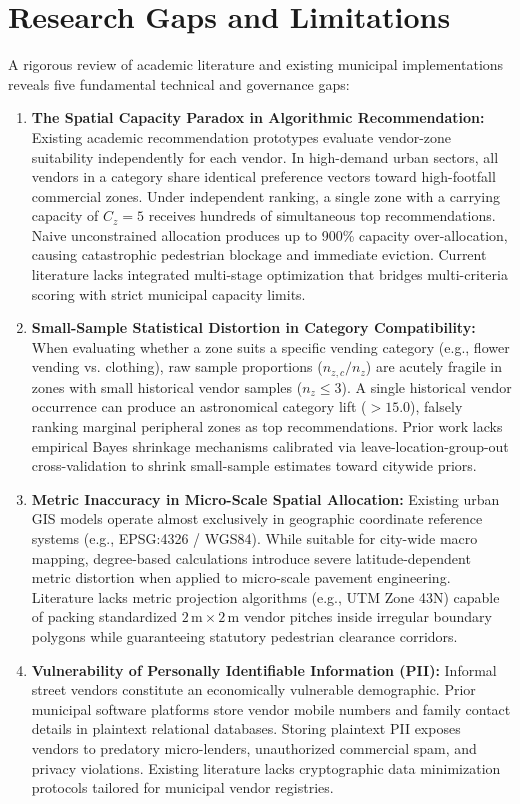 \section{Research Gaps and Limitations}
\label{sec:research_gaps}

A rigorous review of academic literature and existing municipal implementations reveals five fundamental technical and governance gaps:

\begin{enumerate}
    \item \textbf{The Spatial Capacity Paradox in Algorithmic Recommendation:} Existing academic recommendation prototypes evaluate vendor-zone suitability independently for each vendor. In high-demand urban sectors, all vendors in a category share identical preference vectors toward high-footfall commercial zones. Under independent ranking, a single zone with a carrying capacity of $C_z = 5$ receives hundreds of simultaneous top recommendations. Naive unconstrained allocation produces up to 900\% capacity over-allocation, causing catastrophic pedestrian blockage and immediate eviction. Current literature lacks integrated multi-stage optimization that bridges multi-criteria scoring with strict municipal capacity limits.
    \item \textbf{Small-Sample Statistical Distortion in Category Compatibility:} When evaluating whether a zone suits a specific vending category (e.g., flower vending vs. clothing), raw sample proportions ($n_{z,c} / n_z$) are acutely fragile in zones with small historical vendor samples ($n_z \le 3$). A single historical vendor occurrence can produce an astronomical category lift ($> 15.0$), falsely ranking marginal peripheral zones as top recommendations. Prior work lacks empirical Bayes shrinkage mechanisms calibrated via leave-location-group-out cross-validation to shrink small-sample estimates toward citywide priors.
    \item \textbf{Metric Inaccuracy in Micro-Scale Spatial Allocation:} Existing urban GIS models operate almost exclusively in geographic coordinate reference systems (e.g., EPSG:4326 / WGS84). While suitable for city-wide macro mapping, degree-based calculations introduce severe latitude-dependent metric distortion when applied to micro-scale pavement engineering. Literature lacks metric projection algorithms (e.g., UTM Zone 43N) capable of packing standardized $2\,\text{m} \times 2\,\text{m}$ vendor pitches inside irregular boundary polygons while guaranteeing statutory pedestrian clearance corridors.
    \item \textbf{Vulnerability of Personally Identifiable Information (PII):} Informal street vendors constitute an economically vulnerable demographic. Prior municipal software platforms store vendor mobile numbers and family contact details in plaintext relational databases. Storing plaintext PII exposes vendors to predatory micro-lenders, unauthorized commercial spam, and privacy violations. Existing literature lacks cryptographic data minimization protocols tailored for municipal vendor registries.

\end{enumerate}
